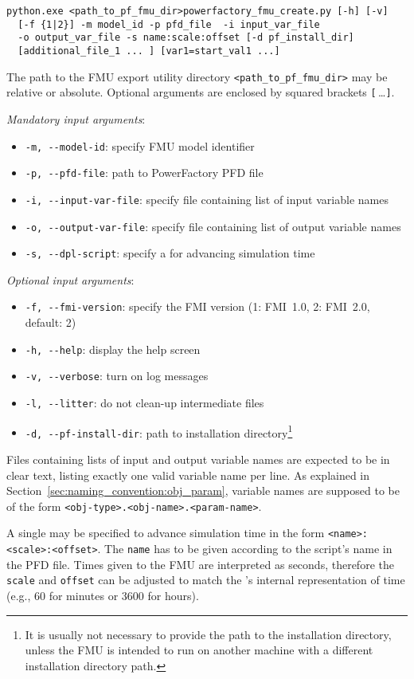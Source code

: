\begin{verbatim}
python.exe <path_to_pf_fmu_dir>powerfactory_fmu_create.py [-h] [-v] 
  [-f {1|2}] -m model_id -p pfd_file  -i input_var_file 
  -o output_var_file -s name:scale:offset [-d pf_install_dir] 
  [additional_file_1 ... ] [var1=start_val1 ...]
\end{verbatim}

The path to the \fmipp \pf FMU export utility directory \verb!<path_to_pf_fmu_dir>! may be relative or absolute.
Optional arguments are enclosed by squared brackets \verb![!$\,$\ldots\verb!]!.
  
\textit{Mandatory input arguments}:
\begin{itemize}
  \item \verb!-m, --model-id!: specify FMU model identifier
  \item \verb!-p, --pfd-file!: path to PowerFactory PFD file
  \item \verb!-i, --input-var-file!: specify file containing list of input variable names
  \item \verb!-o, --output-var-file!: specify file containing list of output variable names
  \item \verb!-s, --dpl-script!: specify a \dplscript for advancing simulation time
\end{itemize}
\textit{Optional input arguments}:
\begin{itemize}
  \item \verb!-f, --fmi-version!: specify the FMI version (1: FMI~1.0, 2: FMI~2.0, default: 2)
  \item \verb!-h, --help!: display the help screen
  \item \verb!-v, --verbose!: turn on log messages
  \item \verb!-l, --litter!: do not clean-up intermediate files
  \item \verb!-d, --pf-install-dir!: path to \pf installation directory\footnote{It is usually not necessary to provide the path to the \pf installation directory, unless the FMU is intended to run on another machine with a different installation directory path.}
\end{itemize}
Files containing lists of input and output variable names are expected to be in clear text, listing exactly one valid variable name per line.
As explained in Section~\ref{sec:naming_convention:obj_param}, variable names are supposed to be of the form \texttt{<obj-type>.<obj-name>.<param-name>}.

A single \dplscript may be specified to advance simulation time in the form \texttt{<name>:<scale>:<offset>}.
The \texttt{name} has to be given according to the script's name in the PFD file.
Times given to the FMU are interpreted as seconds, therefore the \texttt{scale} and \texttt{offset} can be adjusted to match the \dplscript's internal representation of time (e.g., 60 for minutes or 3600 for hours).

